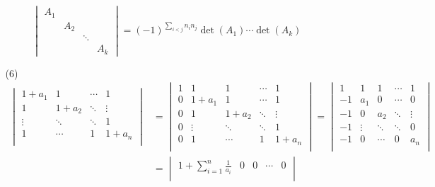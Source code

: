 \documentclass{article}
\begin{document}
\begin{enumerate}
\begin{enumerate}
\[\begin{vmatrix}
                A_1 &     &        &     \\
                    & A_2 &        &     \\
                    &     & \ddots &     \\
                    &     &        & A_k 
            \end{vmatrix}
            =
            {(-1)}^{\sum\limits_{i<j} n_i n_j}
            \det(A_1)\cdots\det(A_k)
        \]
        \item [(6)]
        \begin{align*}
            \begin{vmatrix}
                1+a_1 &     1 & \cdots&      1\\
                    1 & 1+a_2 & \ddots& \vdots\\  
                \vdots& \ddots& \ddots&      1\\
                    1 & \cdots&     1 &  1+a_n\\
                \end{vmatrix}
                &=
                \begin{vmatrix}
                        1 &     1 &     1 & \cdots&      1\\
                        0 & 1+a_1 &     1 & \cdots&      1\\
                        0 &     1 & 1+a_2 & \ddots& \vdots\\  
                        0 & \vdots& \ddots& \ddots&      1\\
                        0 &     1 & \cdots&     1 &  1+a_n\\
                \end{vmatrix}
                =
                \begin{vmatrix}
                    1 &     1 &     1 & \cdots&      1\\
                   -1 &   a_1 &     0 & \cdots&      0\\
                   -1 &     0 &   a_2 & \ddots& \vdots\\  
                   -1 & \vdots& \ddots& \ddots&      0\\
                   -1 &     0 & \cdots&     0 &    a_n\\
                \end{vmatrix}\\
                &=
                \begin{vmatrix}
                    1+\sum\limits_{i=1}^n \frac{1}{a_i} &     0 &     0 & \cdots&      0\\

\end{vmatrix}
\end{align*}
\end{enumerate}
\end{enumerate}
\end{document}
